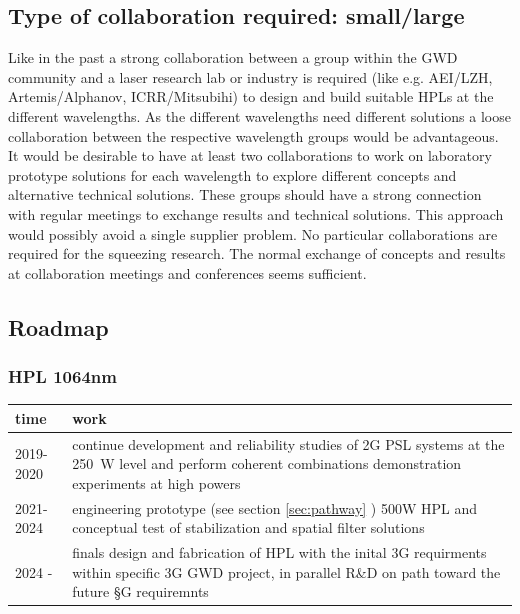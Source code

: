 \subsection{Type of collaboration required:  small/large}
Like in the past a strong collaboration between a group within the GWD community and a laser research lab or industry is required (like e.g.  AEI/LZH, Artemis/Alphanov, ICRR/Mitsubihi) to design and build suitable HPLs at the different wavelengths. As the different wavelengths need different solutions a loose collaboration between the respective wavelength groups would be advantageous. It would be desirable to have at least two collaborations to work on laboratory prototype solutions for each wavelength to explore different concepts and alternative technical solutions. These groups should have a strong connection with regular meetings to exchange results and technical solutions. This approach would possibly avoid a single supplier problem.
No particular collaborations are required for the squeezing research. The normal exchange of concepts and results at collaboration meetings and conferences seems sufficient. 

\subsection{Roadmap}
\subsubsection{HPL 1064nm}
\begin{tabular}{|p{1.8 cm}|p{10cm}|}
	\hline 
	\textbf{time} & \textbf{work}  \\ 
	\hline 
	2019-2020 &continue development and reliability studies of 2G PSL systems at the 250\, W level and perform coherent combinations demonstration experiments at high powers \\ 
	\hline 
	2021-2024 & engineering prototype (see section \ref{sec:pathway} ) 500W HPL and conceptual test of stabilization and spatial filter solutions \\ 
	\hline 
	2024 - & finals design and fabrication of HPL with the inital 3G requirments within specific 3G GWD project, in parallel R\&D on path toward the future §G requiremnts \\ 
	\hline 
\end{tabular} \\

